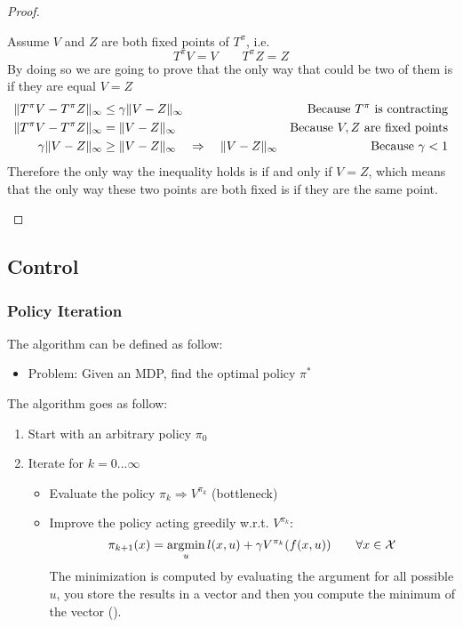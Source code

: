 \begin{proof}
\begin{enumerate}
Assume $V$ and $Z$ are both fixed points of $T^{\pi}$, i.e.
\[T^{\pi}V = V\qquad T^{\pi}Z = Z\]
By doing so we are going to prove that the only way that could be two of them is if they are equal $V=Z$
\begin{align*}
\lVert T^{\pi}V - T^{\pi}Z\rVert_{\infty} &\le \gamma \lVert V-Z\rVert_{\infty}&\text{Because }T^{\pi}\text{ is contracting}\\
\lVert T^{\pi}V - T^{\pi}Z\rVert_{\infty} &= \lVert V - Z\rVert_{\infty} &\text{Because }V,Z \text{ are fixed points}\\
\gamma\lVert V-Z\rVert_{\infty} &\ge \lVert V-Z\rVert_{\infty} \quad\Rightarrow\quad \lVert V-Z\rVert_{\infty} &\text{Because } \gamma <1
\end{align*}
Therefore the only way the inequality holds is if and only if $V=Z$, which means that the only way these two points are both fixed is if they are the same point.
\end{enumerate}
\end{proof}

\subsection{Control}
\subsubsection{Policy Iteration}
The  algorithm can be defined as follow:
\begin{itemize}
\item Problem: Given an MDP, find the optimal policy $\pi^*$
\end{itemize}

The algorithm goes as follow:
\begin{enumerate}
\item Start with an arbitrary policy $\pi_0$
\item Iterate for $k = 0...\infty$ 
\begin{itemize}
\item Evaluate the policy $\pi_k \Rightarrow V^{\pi_k}$ (bottleneck)
\item Improve the policy acting greedily w.r.t. $V^{\pi_k}$:
\[\pi_{k+1}(x) = \operatorname*{argmin}_{u} l(x,u) + \gamma V^{\pi_k}(f(x,u))\qquad \forall x \in \mathcal{X}\]
The minimization is computed by evaluating the argument for all possible $u$, you store the results in a vector and then you compute the minimum of the vector (). 
\end{itemize}
\end{enumerate}

